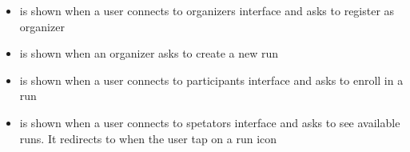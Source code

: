 \documentclass[../DD.tex]{subfiles}
\begin{document}
\begin{itemize}
		\item{ is shown when a user connects to organizers interface and asks to register as organizer}
		\item{ is shown when an organizer asks to create a new run}
		\item{ is shown when a user connects to participants interface and asks to enroll in a run}
		\item{ is shown when a user connects to spetators interface and asks to see available runs. It redirects to  when the user tap on a run icon}
	\end{itemize}
\thispagestyle{fancy}
 
\end{document}
